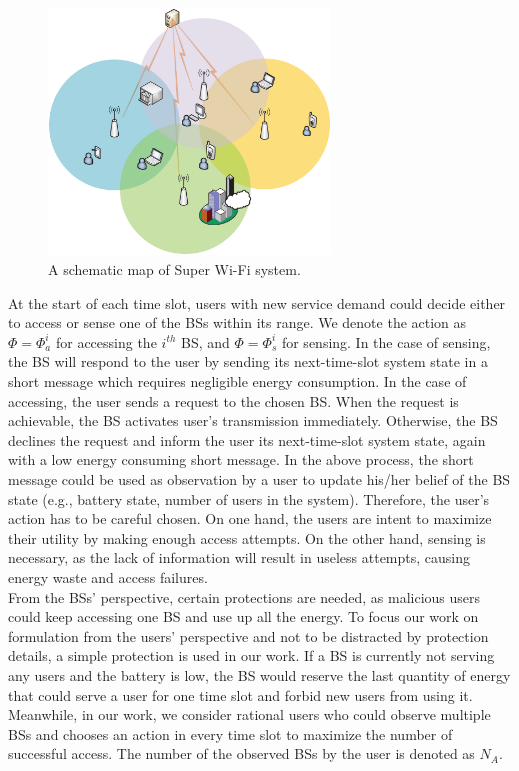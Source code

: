 \documentclass[conference]{IEEEtran}
\begin{document}
\begin{figure}\label{fig1}
\centering
\includegraphics[width=7.5cm]{Fig1.eps}
\caption{A schematic map of Super Wi-Fi system.}
\end{figure}
At the start of each time slot,
users with new service demand could decide either to access or sense one of the BSs within its range.
We denote the action as \(\Phi = \Phi_{a}^i\) for accessing the \(i^{th}\) BS,
and \(\Phi = \Phi_{s}^i\) for sensing.
In the case of sensing,
the BS will respond to the user by sending its next-time-slot system state
in a short message which requires negligible energy consumption.
In the case of accessing, the user sends a request to the chosen BS.
When the request is achievable, the BS activates user's transmission immediately.
Otherwise, the BS declines the request and
inform the user its next-time-slot system state, again with a low energy consuming short message.
In the above process, the short message could
be used as observation by a user to update his/her belief of the BS state (e.g., battery state, number of users in the system).
Therefore, the user's action has to be careful chosen.
On one hand, the users are intent to maximize their utility by making enough access attempts.
On the other hand, sensing is necessary, as the lack of information will result in useless attempts, causing energy waste and access failures.\\
\indent
From the BSs' perspective, certain protections are needed,
as malicious users could keep accessing one BS and use up all the energy.
To focus our work on formulation from the users' perspective and
not to be distracted by protection details,
a simple protection is used in our work.
If a BS is currently not serving any users and the battery is low,
the BS would reserve the last quantity of energy that could serve a user
for one time slot and forbid new users from using it.
Meanwhile, in our work, we consider rational users who could observe multiple BSs and
chooses an action in every time slot to maximize the number of successful access.
The number of the observed BSs by the user is denoted as \(N_A\).
\end{document}
